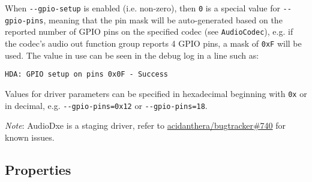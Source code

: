 \documentclass[]{article}
\begin{document}
\begin{itemize}
  When \texttt{-{}-gpio-setup} is enabled (i.e. non-zero), then \texttt{0} is a special
  value for \texttt{-{}-gpio-pins}, meaning that the pin mask will be auto-generated based on the
  reported number of GPIO pins on the specified codec (see \texttt{AudioCodec}), e.g. if the
  codec's audio out function group reports 4 GPIO pins, a mask of \texttt{0xF} will be used.
  The value in use can be seen in the debug log in a line such as: \medskip

  \texttt{HDA: GPIO setup on pins 0x0F - Success} \medskip

  Values for driver parameters can be specified in hexadecimal beginning with \texttt{0x} or
  in decimal, e.g. \texttt{-{}-gpio-pins=0x12} or \texttt{-{}-gpio-pins=18}.
\end{itemize}

\emph{Note}: AudioDxe is a staging driver, refer to \href{https://github.com/acidanthera/bugtracker/issues/740}{acidanthera/bugtracker\#740}
for known issues.

\subsection{Properties}\label{uefiprops}
\end{document}
